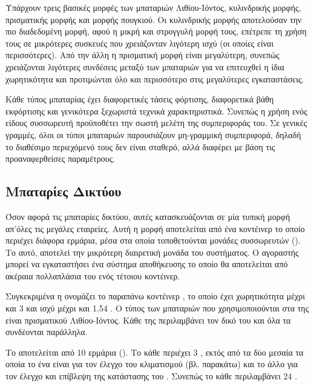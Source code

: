 \documentclass[12pt]{report}
\begin{document}
Υπάρχουν τρεις βασικές μορφές των μπαταριών Λιθίου-Ιόντος, κυλινδρικής μορφής, πρισματικής μορφής και μορφής πουγκιού. Οι κυλινδρικής μορφής αποτελούσαν την πιο διαδεδομένη μορφή, αφού η μικρή και στρογγυλή μορφή τους, 
επέτρεπε τη χρήση τους σε μικρότερες συσκευές που χρειάζονταν λιγότερη ισχύ (οι οποίες είναι περισσότερες). Από την άλλη η πρισματική μορφή είναι μεγαλύτερη, συνεπώς χρειάζονται λιγότερες συνδέσεις μεταξύ των μπαταριών 
για να επιτευχθεί η ίδια χωρητικότητα και προτιμώνται όλο και περισσότερο στις μεγαλύτερες εγκαταστάσεις.

Κάθε τύπος μπαταρίας έχει διαφορετικές τάσεις φόρτισης, διαφορετικά βάθη εκφόρτισης και γενικότερα ξεχωριστά τεχνικά χαρακτηριστικά. Συνεπώς η χρήση ενός είδους συσσωρευτή προϋποθέτει την σωστή μελέτη της συμπεριφοράς του.
Σε γενικές γραμμές, όλοι οι τύποι μπαταριών παρουσιάζουν μη-γραμμική συμπεριφορά, δηλαδή το διαθέσιμο περιεχόμενό τους δεν είναι σταθερό, αλλά διαφέρει με βάση τις προαναφερθείσες παραμέτρους.

\subsection{Μπαταρίες Δικτύου}
Όσον αφορά τις μπαταρίες δικτύου, αυτές κατασκευάζονται σε μία τυπική μορφή απ'όλες τις μεγάλες εταιρείες. Αυτή η μορφή αποτελείται από ένα κοντέινερ το οποίο περιέχει διάφορα ερμάρια, μέσα στα οποία τοποθετούνται
μονάδες συσσωρευτών ({}). Το {} αυτό, αποτελεί την μικρότερη διαιρετική μονάδα του συστήματος. Ο αγοραστής μπορεί να εγκαταστήσει ένα
σύστημα αποθήκευσης το οποίο θα αποτελείται από ακέραια πολλαπλάσια του ενός τέτοιου κοντέινερ. 

Συγκεκριμένα η {} ονομάζει το παραπάνω κοντέινερ {}, το οποίο έχει χωρητικότητα μέχρι και 3 {} και ισχύ μέχρι και 1.54 {}. Ο τύπος των μπαταριών που χρησιμοποιούνται
στα {} της είναι πρισματικού Λιθίου-Ιόντος. Κάθε {} της {} περιλαμβάνει τον δικό του {} και όλα τα {} συνδέονται παράλληλα. 

Το {} αποτελείται από 10 ερμάρια ({}). Το κάθε {} περιέχει 3 {}, εκτός από τα δύο μεσαία τα οποία το ένα είναι για τον έλεγχο του κλιματισμού 
(βλ. παρακάτω) και το άλλο για τον έλεγχο και επίβλεψη της κατάστασης του {}. Συνεπώς το κάθε {} περιλαμβάνει 24 {}.
\end{document}
